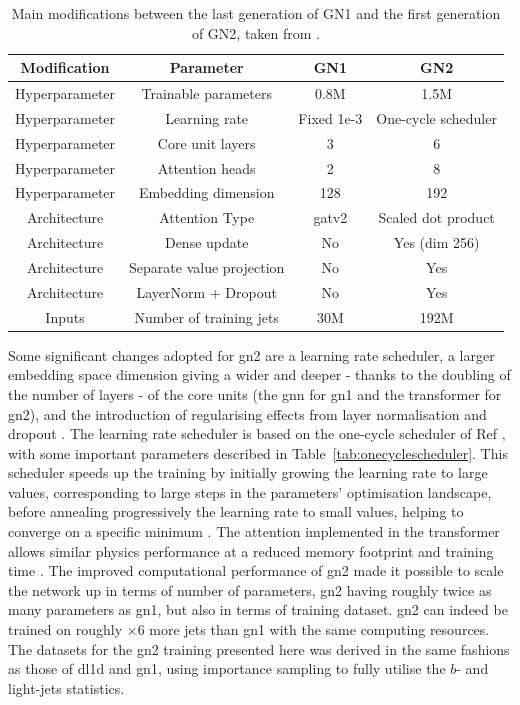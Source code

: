 \begin{table}[h]
  \begin{center}
      \begin{tabular}{c|c|c|c} 
      	 \hline \hline
          Modification & Parameter & GN1 & GN2 \\ \hline
          Hyperparameter  & Trainable parameters & 0.8M & 1.5M \\ 
          Hyperparameter  & Learning rate & Fixed 1e-3 & One-cycle scheduler\\ 
          Hyperparameter  & Core unit layers & 3 & 6 \\ 
          Hyperparameter  & Attention heads & 2 & 8 \\ 
          Hyperparameter  & Embedding dimension & 128 & 192 \\ \hline
          Architecture    & Attention Type & \gls{gat}v2 & Scaled dot product \\ 
          Architecture    & Dense update & No & Yes (dim 256) \\ 
          Architecture    & Separate value projection & No & Yes \\ 
          Architecture    & LayerNorm + Dropout & No & Yes \\ \hline
          Inputs          & Number of training jets & 30M & 192M  \\ \hline \hline
      \end{tabular}
    \caption{Main modifications between the last generation of GN1 and the first generation of GN2, taken from \cite{ATL-PLOT-FTAG-2023-01}.}
    \label{tab:gn2compGN1}
  \end{center}
\end{table}

Some significant changes adopted for \gls{gn2} are a learning rate scheduler, a larger embedding space dimension giving a wider and deeper - thanks to the doubling of the number of layers - of the core units (the \gls{gnn} for \gls{gn1} and the transformer for \gls{gn2}), and the introduction of regularising effects from layer normalisation and dropout \cite{ba2016layer}. The learning rate scheduler is based on the one-cycle scheduler of Ref \cite{smith2018disciplined}, with some important  parameters described in Table~\ref{tab:onecyclescheduler}. This scheduler speeds up the training by initially growing the learning rate to large values, corresponding to large steps in the parameters' optimisation landscape, before annealing progressively the learning rate to small values, helping to converge on a specific minimum \cite{smith2018superconvergence}. The attention implemented in the transformer allows similar physics performance at a reduced memory footprint and training time \cite{duperrin2023flavour}. The improved computational performance of \gls{gn2} made it possible to scale the network up in terms of number of parameters, \gls{gn2} having roughly twice as many parameters as \gls{gn1}, but also in terms of training dataset. \gls{gn2} can indeed be trained on roughly $\times 6$ more jets than \gls{gn1} with the same computing resources. The datasets for the \gls{gn2} training presented here was derived in the same fashions as those of \gls{dl1d} and \gls{gn1}, using importance sampling to fully utilise the $b$- and light-jets statistics. 

